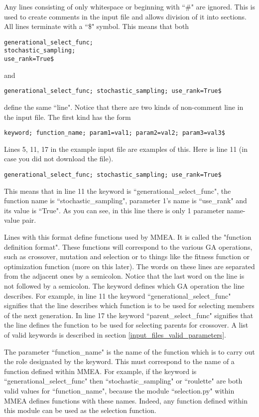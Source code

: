 \documentclass{article}
\begin{document}
Any lines consisting of only whitespace or beginning with ``\#" are ignored. This is used to create comments in the input file and allows division of it into sections. All lines terminate with a ``\$" symbol. This means that both
\begin{verbatim}
generational_select_func; 
stochastic_sampling; 
use_rank=True$
\end{verbatim}
and
\begin{verbatim}
generational_select_func; stochastic_sampling; use_rank=True$
\end{verbatim}
define the same ``line". Notice that there are two kinds of non-comment line in the input file. The first kind has the form
\begin{verbatim}
keyword; function_name; param1=val1; param2=val2; param3=val3$
\end{verbatim}
Lines 5, 11, 17 in the example input file are examples of this. Here is line 11 (in case you did not download the file).
\begin{verbatim}
generational_select_func; stochastic_sampling; use_rank=True$
\end{verbatim}
This means that in line 11 the keyword is ``generational\_select\_func", the function name is ``stochastic\_sampling", parameter 1's name is ``use\_rank" and its value is ``True". As you can see, in this line there is only 1 parameter name-value pair.

Lines with this format define functions used by MMEA. It is called the "function definition format". These functions will correspond to the various GA operations, such as crossover, mutation and selection or to things like the fitness function or optimization function (more on this later). The words on these lines are separated from the adjacent ones by a semicolon. Notice that the last word on the line is not followed by a semicolon. The keyword defines which GA operation the line describes. For example, in line 11 the keyword ``generational\_select\_func" signifies that the line describes which function is to be used for selecting members of the next generation. In line 17 the keyword ``parent\_select\_func" signifies that the line defines the function to be used for selecting parents for crossover. A list of valid keywords is described in section \ref{input_files_valid_parameters}.

The parameter ``function\_name" is the name of the function which is to carry out the role designated by the keyword. This must correspond to the name of a function defined within MMEA. For example, if the keyword is ``generational\_select\_func" then ``stochastic\_sampling" or ``roulette" are both valid values for ``function\_name", because the module ``selection.py" within MMEA defines functions with these names. Indeed, any function defined within this module can be used as the selection function.
\end{document}
